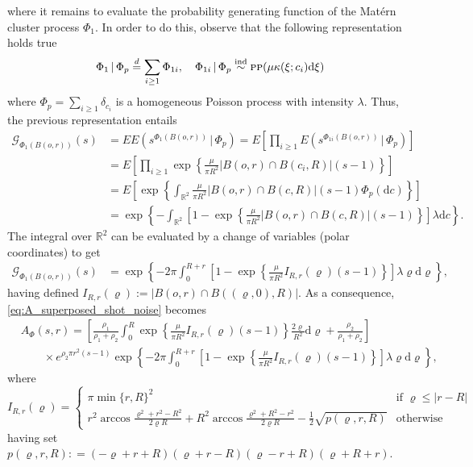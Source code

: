 \documentclass[11pt,a4paper,oneside]{article}
\newcommand{\dd}{\mathrm d}
\newcommand{\E}{E}
\newcommand{\R}{\mathbb{R}}
\renewcommand{\mid}{\ensuremath{\,|\,}}
\def\simind{\stackrel{\mbox{\scriptsize{\rm ind}}}{\sim}}
\theoremstyle{definition}
\theoremstyle{remark}
\begin{document}
where it remains to evaluate the probability generating function of the Mat\'ern cluster process $\Phi_1$. In order to do this, observe that the following representation holds true
\[
\Phi_1 \mid \Phi_p \stackrel{d}{=} \sum_{i \geq 1} \Phi_{1i} , \quad \Phi_{1i }  \mid \Phi_p \simind \textsc{pp} (\mu \kappa (\xi ; c_i) \dd \xi )
\]
where $\Phi_p = \sum_{i \geq 1} \delta_{c_i}$ is a homogeneous Poisson process with intensity $\lambda$. Thus, the previous representation entails
\begin{align*}
    \mathcal{G}_{\Phi_1 (B (o, r))} (s) & = \E \E \left( s^{\Phi_1 (B (o, r))}\mid \Phi_p\right) = \E \left[ \prod_{i \geq 1}  \E \left( s^{\Phi_{1i} (B (o, r))}\mid \Phi_p\right)\right] \\
    & = \E \left[ \prod_{i \geq 1}   \exp \left\{ \frac{\mu}{\pi R^2} |B (o, r) \cap B (c_i, R)| (s-1) \right\}\right] \\
        & = \E \left[  \exp \left\{ \int_{\R^2}\frac{\mu}{\pi R^2} |B (o, r) \cap B (c, R)| (s-1) \Phi_p (\dd c) \right\}\right] \\
        & = \exp \left\{ - \int_{\R^2} \left[ 1- \exp \left\{ \frac{\mu}{\pi R^2} |B (o, r) \cap B (c, R)|  (s-1)\right\}\right] \lambda \dd c  \right\}.
\end{align*}
The integral over $\R^2$ can be evaluated by a change of variables (polar coordinates) to get
\begin{align*}
    \mathcal{G}_{\Phi_1 (B (o, r))} (s) &  = \exp \left\{ - 2 \pi \int_0^{R+r} \left[ 1- \exp \left\{ \frac{\mu}{\pi R^2} I_{R,r} (\varrho)  (s-1)\right\}\right] \lambda \varrho \dd \varrho  \right\},
\end{align*}
 having defined $I_{R,r} (\varrho) := |B (o, r) \cap B ((\varrho, 0), R)|$. As a consequence, \eqref{eq:A_superposed_shot_noise} becomes
\begin{equation}
    \label{eq:A_superposed_shot_noise_final}
    \begin{split}
    &A_{\Phi} (s, r) = \left[\frac{\rho_1}{\rho_1+ \rho_2}\int_0^R  \exp \left\{\frac{\mu}{\pi R^2} I_{R, r} (\varrho) (s-1)\right\}  \frac{2 \varrho }{R^2} \dd \varrho
 +  \frac{\rho_2}{\rho_1+ \rho_2}  \right]  \\
& \qquad \times e^{\rho_2 \pi r^2 (s-1)}\exp \left\{ - 2 \pi \int_0^{R+r} \left[ 1- \exp \left\{ \frac{\mu}{\pi R^2} I_{R,r} (\varrho)  (s-1)\right\}\right] \lambda \varrho \dd \varrho  \right\},
\end{split}
\end{equation}
where
\[
I_{R,r} (\varrho) = \left\{ \begin{array}{cc}
   \pi \min \{ r, R\}^2  & \text{if } \varrho \leq |r-R|  \\
   r^2 \arccos{\frac{\varrho^2 + r^2 -R^2}{2 \varrho R}} + R^2 \arccos{ \frac{\varrho^2+ R^2 -r^2 }{2 \varrho R}} - \frac{1}{2} 
   \sqrt{p (\varrho, r, R)}& \text{otherwise }
\end{array}
\right.
\]
having set $p (\varrho, r, R) : = (-\varrho + r + R) (\varrho + r - R) (\varrho-r + R) (\varrho + R + r)$.\\
\end{document}
